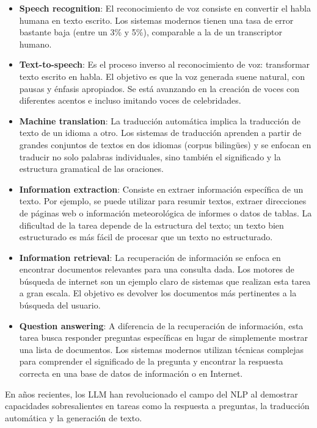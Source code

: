 \begin{itemize}
    \item \textbf{Speech recognition}: El reconocimiento de voz consiste en convertir 
    el habla humana en texto escrito. Los sistemas modernos tienen una tasa de error 
    bastante baja (entre un 3\% y 5\%), comparable a la de un transcriptor humano.
    \item \textbf{Text-to-speech}: Es el proceso inverso al reconocimiento de voz: 
    transformar texto escrito en habla. El objetivo es que la voz generada suene natural, 
    con pausas y énfasis apropiados. Se está avanzando en la creación de voces con 
    diferentes acentos e incluso imitando voces de celebridades.
    \item \textbf{Machine translation}: La traducción automática implica la traducción 
    de texto de un idioma a otro. Los sistemas de traducción aprenden a partir de grandes 
    conjuntos de textos en dos idiomas (corpus bilingües) y se enfocan en traducir no 
    solo palabras individuales, sino también el significado y la estructura gramatical 
    de las oraciones.
    \item \textbf{Information extraction}: Consiste en extraer información específica 
    de un texto. Por ejemplo, se puede utilizar para resumir textos, extraer direcciones 
    de páginas web o información meteorológica de informes o datos de tablas. 
    La dificultad de la tarea depende de la estructura del texto; un texto bien 
    estructurado es más fácil de procesar que un texto no estructurado.
    \item \textbf{Information retrieval}: La recuperación de información se enfoca 
    en encontrar documentos relevantes para una consulta dada. Los motores de búsqueda 
    de internet son un ejemplo claro de sistemas que realizan esta tarea a gran escala. 
    El objetivo es devolver los documentos más pertinentes a la búsqueda del usuario.
    \item \textbf{Question answering}: A diferencia de la recuperación de información, 
    esta tarea busca responder preguntas específicas en lugar de simplemente mostrar 
    una lista de documentos. Los sistemas modernos utilizan técnicas complejas para 
    comprender el significado de la pregunta y encontrar la respuesta correcta en 
    una base de datos de información o en Internet.
\end{itemize}

En años recientes, los LLM han revolucionado el campo del NLP al demostrar capacidades 
sobresalientes en tareas como la respuesta a preguntas, la traducción automática y 
la generación de texto.

